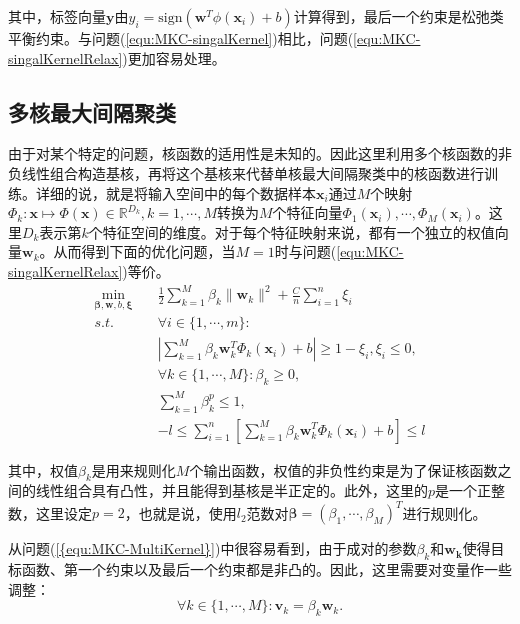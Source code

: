 其中，标签向量$\mathbf{y}$由$y_i=\mathrm{sign}(\mathbf{w}^T\phi(\mathbf{x}_i)+b)$计算得到，最后一个约束是松弛类平衡约束。与问题(\ref{equ:MKC-singalKernel})相比，问题(\ref{equ:MKC-singalKernelRelax})更加容易处理。

\subsection{多核最大间隔聚类}
由于对某个特定的问题，核函数的适用性是未知的。因此这里利用多个核函数的非负线性组合构造基核，再将这个基核来代替单核最大间隔聚类中的核函数进行训练。详细的说，就是将输入空间中的每个数据样本$\mathbf{x}_i$通过$M$个映射$\Phi_k:\mathbf{x}\mapsto \Phi(\mathbf{x})\in \mathbb{R}^{D_k},k=1,\cdots,M$转换为$M$个特征向量$\Phi_1(\mathbf{x}_i),\cdots,\Phi_M(\mathbf{x}_i)$。这里$D_k$表示第$k$个特征空间的维度。对于每个特征映射来说，都有一个独立的权值向量$\mathbf{w}_k$。从而得到下面的优化问题，当$M=1$时与问题(\ref{equ:MKC-singalKernelRelax})等价。
\begin{equation}
\begin{split}
\min_{\mathbf{\beta},\mathbf{w},b,\mathbf{\xi}} \quad & \frac{1}{2}\sum^M_{k=1}\beta_k\|\mathbf{w}_k\|^2+\frac{C}{n}\sum^n_{i=1}\xi_i \\
s.t. \quad & \forall i \in \{1,\cdots,m\}:  \\
& \left |\sum^M_{k=1}\beta_k\mathbf{w}_k^T\Phi_k(\mathbf{x}_i)+b\right | \ge 1-\xi_i,\xi_i \le 0,   \\
& \forall k \in \{1,\cdots,M\}:\beta_k \ge 0,   \\
& \sum^M_{k=1}\beta_k^p \le 1,   \\
& -l \le \sum^n_{i=1}\left[\sum^M_{k=1}\beta_k\mathbf{w}_k^T\Phi_k(\mathbf{x}_i)+b\right] \le l 
\label{equ:MKC-MultiKernel}
\end{split}
\end{equation}

其中，权值$\beta_k$是用来规则化$M$个输出函数，权值的非负性约束是为了保证核函数之间的线性组合具有凸性，并且能得到基核是半正定的。此外，这里的$p$是一个正整数，这里设定$p=2$，也就是说，使用$l_2$范数对$\mathbf{\beta}=(\beta_1,\cdots,\beta_M)^T$进行规则化。

从问题(\ref{{equ:MKC-MultiKernel}})中很容易看到，由于成对的参数$\beta_k$和$\mathbf{w_k}$使得目标函数、第一个约束以及最后一个约束都是非凸的。因此，这里需要对变量作一些调整：
\begin{equation}
\forall k\in\{1,\cdots,M\}:\mathbf{v}_k=\beta_k\mathbf{w}_k. 
\end{equation}

